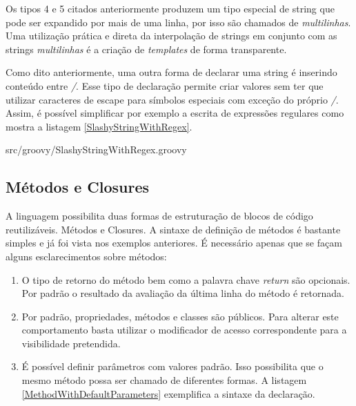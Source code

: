 \documentclass[12pt]{article}
\begin{document}
    Os tipos 4 e 5 citados anteriormente produzem um tipo especial de string que
    pode ser expandido por mais de uma linha, por isso são chamados de \emph{multilinhas}.
    Uma utilização prática e direta da interpolação de strings em conjunto com as
    strings \emph{multili\-nhas} é a criação de \emph{templates} de forma transparente. 
    
    Como dito anteriormente, uma outra forma de declarar uma string é inserindo
    conteúdo entre \emph{/}. Esse tipo de declaração permite criar valores sem 
    ter que utilizar ca\-racteres de escape para símbolos especiais com exceção 
    do próprio \emph{/}. Assim, é possível simplificar por exemplo a escrita de 
    expressões regulares como mostra a listagem \ref{SlashyStringWithRegex}.
    
    
                    {src/groovy/SlashyStringWithRegex.groovy}

\subsection{Métodos e Closures}

    A linguagem possibilita duas formas de estruturação de blocos de código 
    reutilizáveis. Métodos e Closures. A sintaxe de definição de métodos
    é bastante simples e já foi vista nos exemplos anteriores. É necessário apenas
    que se façam alguns esclarecimentos sobre métodos:

    \begin{enumerate}
        \item O tipo de retorno do método bem como a palavra chave \emph{return}
              são opcionais. Por padrão o resultado da avaliação da última linha
              do método é retornada.
        \item Por padrão, propriedades, métodos e classes são públicos. Para alterar
              este comportamento basta utilizar o modificador de acesso correspondente
              para a visibilidade pretendida.
        \item É possível definir parâmetros com valores padrão. Isso possibilita
              que o mesmo método possa ser chamado de diferentes formas. A listagem
              \ref{MethodWithDefaultParameters} exemplifica a sintaxe da declaração.
    \end{enumerate}
    
\end{document}
